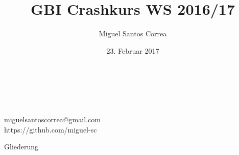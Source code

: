 \documentclass[18pt]{beamer}
\title[GBI Crashkurs]{GBI Crashkurs WS 2016/17}
\author{Miguel Santos Correa}
\date{23. Februar 2017}
\makeatletter
\newcommand*{\currentname}{\@currentlabelname}
\makeatother
\begin{document}

\begin{frame}
  \begin{center}
    \huge\inserttitle\\
    \vskip 1.75mm
    \normalsize
    \insertauthor\\
    \insertdate\\
    \vskip 1.75mm
    \large
    miguelsantoscorrea@gmail.com\\
    \vskip 1.75mm
    https://github.com/miguel-sc
  \end{center}
\end{frame}

\begin{frame}{Gliederung}
  \tableofcontents
\end{frame}

\AtBeginSection[]
{
  \begin{frame}
    \begin{center}
      \huge \currentname
    \end{center}
  \end{frame}
}






\end{document}
